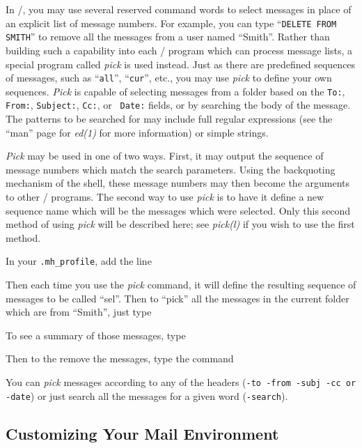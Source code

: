 In \MM/, you may use several reserved command words to select messages
in place of an explicit list of message numbers.  For example, you can
type ``{\tt DELETE FROM SMITH}'' to remove all the messages from a user named
``Smith''.  Rather than building such a capability into each \MH/ program
which can process message lists, a special program called {\it pick\/} is
used instead.  Just as there are predefined sequences of messages, such as
``{\tt all}'', ``{\tt cur}'', etc., you may use {\it pick\/} to define your
own sequences.  {\it Pick\/} is capable of selecting messages from a folder
based on the {\tt To:}, {\tt From:}, {\tt Subject:}, {\tt Cc:}, or {\tt
Date:} fields, or by searching the body of the message.  The patterns to be
searched for may include full regular expressions (see the ``man'' page for
{\it ed(1)\/} for more information) or simple strings.

{\it Pick\/} may be used in one of two ways.  First, it may output the
sequence of message numbers which match the search parameters.  Using the
backquoting mechanism of the shell, these message numbers may then become
the arguments to other \MH/ programs.  The second way to use {\it pick\/} is
to have it define a new sequence name which will be the messages which were
selected.  Only this second method of using {\it pick\/} will be described
here; see {\it pick(l)\/} if you wish to use the first method.

In your \verb|.mh_profile|, add the line


Then each time you use the {\it pick\/} command, it will define the
resulting sequence of messages to be called ``sel''.  Then to ``pick'' all
the messages in the current folder which are from ``Smith'', just type


To see a summary of those messages, type


Then to the remove the messages, type the command


You can {\it pick\/} messages according to any of the headers ({\tt -to
-from -subj -cc {\rm or} -date}) or just search all the messages for a given
word ({\tt -search}).

\subsection{Customizing Your Mail Environment}\label{Tailoring}

